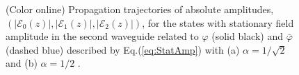 \documentclass[9pt,twocolumn,twoside]{osajnl}
\begin{document}
\begin{figure}[htbp]
	\centering
	\caption{(Color online) Propagation trajectories of absolute amplitudes, $(\vert \mathcal{E}_{0}(z) \vert, \vert \mathcal{E}_{1}(z) \vert, \vert \mathcal{E}_{2}(z) \vert )$,  for the states with stationary field amplitude in the second waveguide related to $\varphi$ (solid black) and $\bar{\varphi}$ (dashed blue) described by Eq.(\ref{eq:StatAmp}) with (a) $\alpha = 1 / \sqrt{2}$ and (b) $\alpha = 1 / 2$ .}
	\label{fig:Fig5}
\end{figure}
\end{document}
